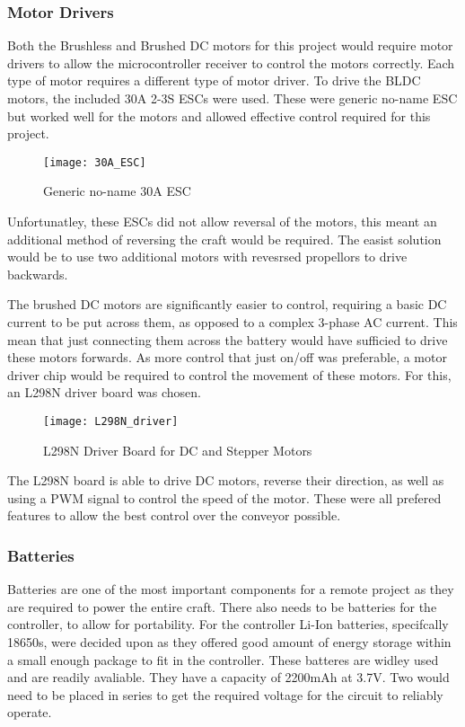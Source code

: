 \documentclass [11pt]{article}
\begin{document}
\subsubsection{Motor Drivers}


Both the Brushless and Brushed DC motors for this project would require motor drivers to allow the microcontroller receiver to control the motors correctly. Each type of motor requires a different type of motor driver. To drive the BLDC motors, the included 30A 2-3S ESCs were used. These were generic no-name ESC but worked well for the motors and allowed effective control required for this project. 

\begin{figure}[H]
\centerline{\texttt{[image: 30A\_ESC]}}
\caption{Generic no-name 30A ESC}
\label{fig:30A_ESC}
\end{figure}

Unfortunatley, these ESCs did not allow reversal of the motors, this meant an additional method of reversing the craft would be required. The easist solution would be to use two additional motors with revesrsed propellors to drive backwards.

The brushed DC motors are significantly easier to control, requiring a basic DC current to be put across them, as opposed to a complex 3-phase AC current. This mean that just connecting them across the battery would have sufficied to drive these motors forwards. As more control that just on/off was preferable, a motor driver chip would be required to control the movement of these motors. For this, an L298N driver board was chosen. 

\begin{figure}[H]
\centerline{\texttt{[image: L298N\_driver]}}
\caption{L298N Driver Board for DC and Stepper Motors}
\label{fig:L298N_driver}
\end{figure}

The L298N board is able to drive DC motors, reverse their direction, as well as using a PWM signal to control the speed of the motor. These were all prefered features to allow the best control over the conveyor possible. 

\subsubsection{Batteries}

Batteries are one of the most important components for a remote project as they are required to power the entire craft. There also needs to be batteries for the controller, to allow for portability. For the controller Li-Ion batteries, specifcally 18650s, were decided upon as they offered good amount of energy storage within a small enough package to fit in the controller. These batteres are widley used and are readily avaliable. They have a capacity of 2200mAh at 3.7V. Two would need to be placed in series to get the required voltage for the circuit to reliably operate. 
\end{document}
